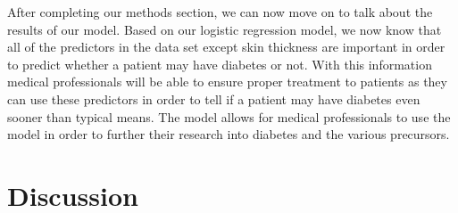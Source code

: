 \documentclass[12pt]{article}
\begin{document}
After completing our methods section, we can now move on to talk about the results of our model. Based on our logistic regression model, we now know that all of the predictors in the data set except skin thickness are important in order to predict whether a patient may have diabetes or not. With this information medical professionals will be able to ensure proper treatment to patients as they can use these predictors in order to tell if a patient may have diabetes even sooner than typical means. The model allows for medical professionals to use the model in order to further their research into diabetes and the various precursors.

\section{Discussion}
\label{sec:disc}



\end{document}
